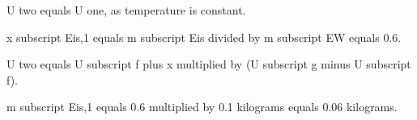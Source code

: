 U two equals U one, as temperature is constant.  

x subscript Eis,1 equals m subscript Eis divided by m subscript EW equals 0.6.  

U two equals U subscript f plus x multiplied by (U subscript g minus U subscript f).  

m subscript Eis,1 equals 0.6 multiplied by 0.1 kilograms equals 0.06 kilograms.